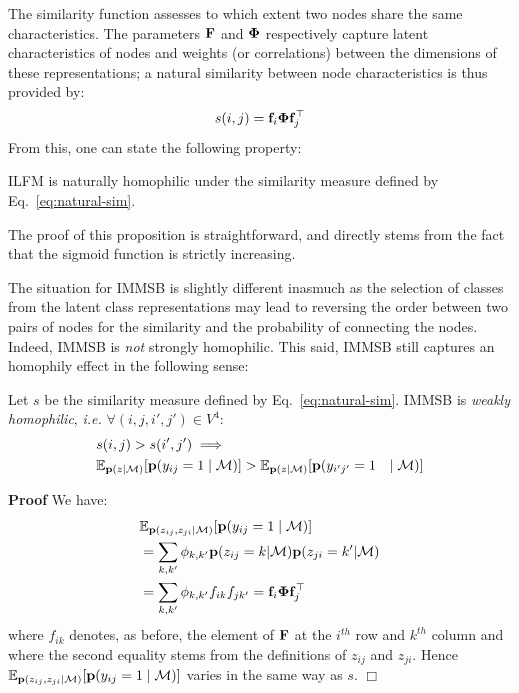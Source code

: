The similarity function assesses to which extent two nodes share the same characteristics. The parameters $\mathbf{F}$ and $\mathbf{\Phi}$ respectively capture latent characteristics of nodes and weights (or correlations) between the dimensions of these representations; a natural similarity between node characteristics is thus provided by:
%
\begin{equation}
s(i,j) = \mat{f}_{i} \mat{\Phi} \mat{f}_j^\top
\label{eq:natural-sim}
\end{equation}
%
From this, one can state the following property:
%
\begin{proposition}[]
ILFM is naturally homophilic under the similarity measure defined by Eq.~\ref{eq:natural-sim}.
\end{proposition}
%
\noindent The proof of this proposition is straightforward, and directly stems from the fact that the sigmoid function is strictly increasing.

The situation for IMMSB is slightly different inasmuch as the selection of classes from the latent class representations may lead to reversing the order between two pairs of nodes for the similarity and the probability of connecting the nodes. Indeed, IMMSB is \textit{not} strongly homophilic. This said, IMMSB still captures an homophily effect in the following sense:
%
\begin{proposition}[]
Let $s$ be the similarity measure defined by Eq.~\ref{eq:natural-sim}. IMMSB is \emph{weakly homophilic}, \textit{i.e.}  $\forall (i,j,i',j') \in V^4$:
%
\begin{align}
&s(i,j) > s(i',j')  \implies \nonumber \\
&\mathbb{E}_{\mathbf{p}(z|\mathcal{M})}[\mathbf{p}(y_{ij}=1 \mid \mathcal{M})] > \mathbb{E}_{\mathbf{p}(z|\mathcal{M})}[\mathbf{p}(y_{i'j'}=1  &\mid \mathcal{M})] \nonumber
\end{align}
\end{proposition}
%
\noindent \textbf{Proof} We have:
%
\begin{align}
&\mathbb{E}_{\mathbf{p}(z_{ij},z_{ji}|\mathcal{M})}[\mathbf{p}(y_{ij}=1 \mid \mathcal{M})]\nonumber \\
&= \sum_{k,k'} \phi_{k,k'} \mathbf{p}(z_{ij}=k|\mathcal{M}) \mathbf{p}(z_{ji}=k'|\mathcal{M}) \nonumber \\
&= \sum_{k,k'} \phi_{k,k'} f_{ik} f_{jk'} = \mathbf{f}_i \mathbf{\Phi} \mathbf{f}_j^\top \nonumber
\end{align}
%
where $f_{ik}$ denotes, as before, the element of $\mathbf{F}$ at the $i^{th}$ row and $k^{th}$ column and where the second equality stems from the definitions of $z_{ij}$ and $z_{ji}$. Hence $\mathbb{E}_{\mathbf{p}(z_{ij},z_{ji}|\mathcal{M})}[\mathbf{p}(y_{ij}=1 \mid \mathcal{M})]$ varies in the same way as $s$. \hfill$\Box$ \\

